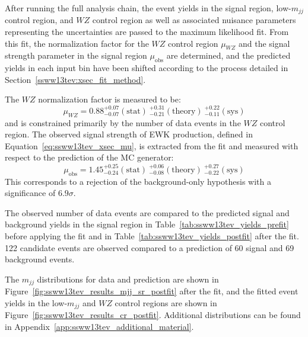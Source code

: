 
After running the full analysis chain, the event yields in the signal region, low-$m_{jj}$ control region, and $WZ$ control region as well as associated nuisance parameters representing the uncertainties are passed to the maximum likelihood fit.
From this fit, the normalization factor for the $WZ$ control region $\mu_{WZ}$ and the signal strength parameter in the signal region $\mu_{\textrm{obs}}$ are determined, and the predicted yields in each input bin have been shifted according to the process detailed in Section~\ref{ssww13tev:xsec_fit_method}.

The $WZ$ normalization factor is measured to be:
\begin{equation}
  \mu_{WZ} = 0.88^{+0.07}_{-0.07}(\textrm{stat})~^{+0.31}_{-0.21}(\textrm{theory})~^{+0.22}_{-0.11}(\textrm{sys})
  \label{eq:ssww13tev_signal_strength_wz}
\end{equation}
and is constrained primarily by the number of data events in the $WZ$ control region.
The observed signal strength of \ssww EWK production, defined in Equation~\ref{eq:ssww13tev_xsec_mu}, is extracted from the fit and measured with respect to the prediction of the  MC generator:
\begin{equation}
  \mu_{\textrm{obs}} = 1.45^{+0.25}_{-0.24}(\textrm{stat})~^{+0.06}_{-0.08}(\textrm{theory})~^{+0.27}_{-0.22}(\textrm{sys}) %
  \label{eq:ssww13tev_signal_strength_sr}
\end{equation}
This corresponds to a rejection of the background-only hypothesis with a significance of $6.9\sigma$.

The observed number of data events are compared to the predicted signal and background yields in the signal region in Table~\ref{tab:ssww13tev_yields_prefit} before applying the fit and in Table~\ref{tab:ssww13tev_yields_postfit} after the fit.
122 candidate events are observed compared to a prediction of 60 signal and 69 background events.

The $m_{jj}$ distributions for data and prediction are shown in Figure~\ref{fig:ssww13tev_results_mjj_sr_postfit} after the fit, and the fitted event yields in the low-$m_{jj}$ and $WZ$ control regions are shown in Figure~\ref{fig:ssww13tev_results_cr_postfit}.
Additional distributions can be found in Appendix~\ref{app:ssww13tev_additional_material}.

